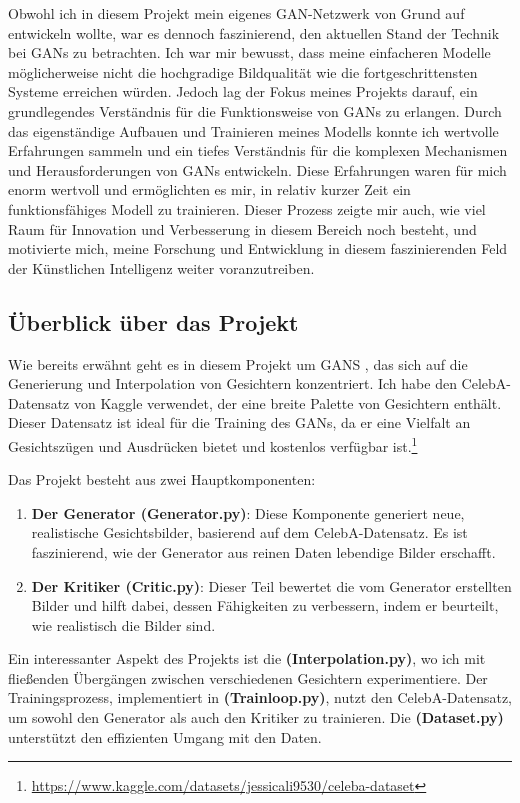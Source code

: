 \documentclass[a4paper, 12pt]{article}
\begin{document}
Obwohl ich in diesem Projekt mein eigenes GAN-Netzwerk von Grund auf entwickeln wollte, war es dennoch faszinierend, den aktuellen Stand der Technik bei GANs zu betrachten. Ich war mir bewusst, dass meine einfacheren Modelle möglicherweise nicht die hochgradige Bildqualität wie die fortgeschrittensten Systeme erreichen würden. Jedoch lag der Fokus meines Projekts darauf, ein grundlegendes Verständnis für die Funktionsweise von GANs zu erlangen. Durch das eigenständige Aufbauen und Trainieren meines Modells konnte ich wertvolle Erfahrungen sammeln und ein tiefes Verständnis für die komplexen Mechanismen und Herausforderungen von GANs entwickeln. Diese Erfahrungen waren für mich enorm wertvoll und ermöglichten es mir, in relativ kurzer Zeit ein funktionsfähiges Modell zu trainieren. Dieser Prozess zeigte mir auch, wie viel Raum für Innovation und Verbesserung in diesem Bereich noch besteht, und motivierte mich, meine Forschung und Entwicklung in diesem faszinierenden Feld der Künstlichen Intelligenz weiter voranzutreiben.

\subsection{Überblick über das Projekt}
Wie bereits erwähnt geht es in diesem Projekt  um GANS , das sich auf die Generierung und Interpolation von Gesichtern konzentriert. Ich habe den CelebA-Datensatz von Kaggle verwendet, der eine breite Palette von Gesichtern enthält. Dieser Datensatz ist ideal für die Training des GANs, da er eine Vielfalt an Gesichtszügen und Ausdrücken bietet und kostenlos verfügbar ist.\footnote{\url{https://www.kaggle.com/datasets/jessicali9530/celeba-dataset}}

Das Projekt besteht aus zwei Hauptkomponenten:
\begin{enumerate}
  \item \textbf{Der Generator (Generator.py)}: Diese Komponente generiert neue, realistische Gesichtsbilder, basierend auf dem CelebA-Datensatz. Es ist faszinierend, wie der Generator aus reinen Daten lebendige Bilder erschafft.
  \item \textbf{Der Kritiker (Critic.py)}: Dieser Teil bewertet die vom Generator erstellten Bilder und hilft dabei, dessen Fähigkeiten zu verbessern, indem er beurteilt, wie realistisch die Bilder sind.
\end{enumerate}

Ein interessanter Aspekt des Projekts ist die \textbf{(Interpolation.py)}, wo ich mit fließenden Übergängen zwischen verschiedenen Gesichtern experimentiere. Der Trainingsprozess, implementiert in \textbf{(Trainloop.py)}, nutzt den CelebA-Datensatz, um sowohl den Generator als auch den Kritiker zu trainieren. Die \textbf{(Dataset.py)} unterstützt den effizienten Umgang mit den Daten.
\end{document}
